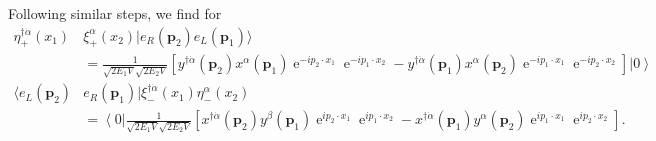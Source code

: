 Following similar steps, we find for
\begin{align}
\eta^{\dagger\dot{\alpha}}_+(x_1)&\xi^{\alpha}_+(x_2)|e_R(\mathbf{p}_2)e_L(\mathbf{p}_1)\rangle
 \nonumber\\
\label{eq:berer}
&=\frac{1 }{\sqrt{2 E_1V}\sqrt{2 E_2V}} \left[ y^{\dagger\dot{\alpha}}(\mathbf{p}_2)x^{\alpha}(\mathbf{p}_1)
\operatorname{e}^{-i p_2\cdot x_1}\operatorname{e}^{-i p_1\cdot x_2}
-y^{\dagger\dot{\alpha}}(\mathbf{p}_1)x^{\alpha}(\mathbf{p}_2)
\operatorname{e}^{-i p_1\cdot x_1}\operatorname{e}^{-i p_2\cdot x_2}   \right] \left|0\right\rangle \\
\langle e_L(\mathbf{p}_2)&e_R(\mathbf{p}_1)| \xi^{\dagger\dot{\alpha}}_-(x_1)\eta^{\alpha}_-(x_2)
 \nonumber\\
\label{eq:berer}
&=\left\langle 0\right|\frac{1 }{\sqrt{2 E_1V}\sqrt{2 E_2V}} \left[ x^{\dagger\dot{\alpha}}(\mathbf{p}_2)y^{\beta}(\mathbf{p}_1)
\operatorname{e}^{i p_2\cdot x_1}\operatorname{e}^{i p_1\cdot x_2}
- x^{\dagger\dot{\alpha}}(\mathbf{p}_1)y^{\alpha}(\mathbf{p}_2)
\operatorname{e}^{i p_1\cdot x_1}\operatorname{e}^{i p_2\cdot x_2}   \right].
\end{align}









